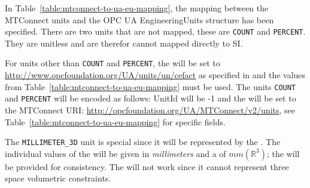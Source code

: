 In Table~\ref{table:mtconnect-to-ua-eu-mapping}, the mapping between the MTConnect units and the OPC UA EngineeringUnits structure has been specified. There are two units that are not mapped, these are \texttt{COUNT} and \texttt{PERCENT}. They are unitless and are therefor cannot mapped directly to SI.

For units other than  \texttt{COUNT} and \texttt{PERCENT}, the  will be set to \url{http://www.opcfoundation.org/UA/units/un/cefact} as specified in \cite{UAPart8} and the values from Table~\ref{table:mtconnect-to-ua-eu-mapping} must be used. The units \texttt{COUNT} and \texttt{PERCENT} will be encoded as follows: UnitId will be -1 and the  will be set to the MTConnect URI: \url{http://opcfoundation.org/UA/MTConnect/v2/units}, see Table~\ref{table:mtconnect-to-ua-eu-mapping} for specific fields.

The \texttt{MILLIMETER_3D} unit is special since it will be represented by the . The individual values of the   will be given in \textit{millimeters} and a  of $mm(\mathbb{R}^{3})$; the  will be provided for consistency. The  will not work since it cannot represent three space volumetric constraints.

